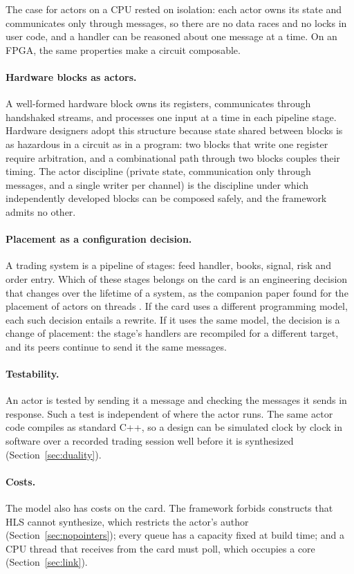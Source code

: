 \documentclass[11pt]{article}
\begin{document}
The case for actors on a CPU \cite{fastsend} rested on isolation: each actor
owns its state and communicates only through messages, so there are no data
races and no locks in user code, and a handler can be reasoned about one
message at a time. On an FPGA, the same properties make a circuit composable.

\paragraph{Hardware blocks as actors.} A well-formed hardware block owns its
registers, communicates through handshaked streams, and processes one input at
a time in each pipeline stage. Hardware designers adopt this structure because
state shared between blocks is as hazardous in a circuit as in a program: two
blocks that write one register require arbitration, and a combinational path
through two blocks couples their timing. The actor discipline (private state,
communication only through messages, and a single writer per channel) is the
discipline under which independently developed blocks can be composed safely,
and the framework admits no other.

\paragraph{Placement as a configuration decision.} A trading system is a
pipeline of stages: feed handler, books, signal, risk and order entry. Which of
these stages belongs on the card is an engineering decision that changes over
the lifetime of a system, as the companion paper found for the placement of
actors on threads \cite{fastsend}. If the card uses a different programming
model, each such decision entails a rewrite. If it uses the same model, the
decision is a change of placement: the stage's handlers are recompiled for a
different target, and its peers continue to send it the same messages.

\paragraph{Testability.} An actor is tested by sending it a message and
checking the messages it sends in response. Such a test is independent of where
the actor runs. The same actor code compiles as standard C++, so a design can
be simulated clock by clock in software over a recorded trading session well
before it is synthesized (Section~\ref{sec:duality}).

\paragraph{Costs.} The model also has costs on the card. The framework forbids
constructs that HLS cannot synthesize, which restricts the actor's author
(Section~\ref{sec:nopointers}); every queue has a capacity fixed at build time;
and a CPU thread that receives from the card must poll, which occupies a core
(Section~\ref{sec:link}).
\end{document}
